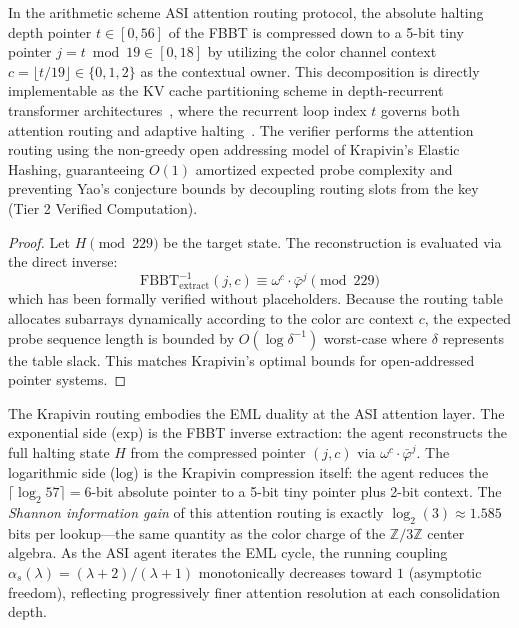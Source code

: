 \begin{theorem}
\label{thm:krapivin_routing}
In the arithmetic scheme ASI attention routing protocol, the absolute halting depth pointer $t \in [0, 56]$ of the FBBT is compressed down to a 5-bit tiny pointer $j = t \bmod 19 \in [0, 18]$ by utilizing the color channel context $c = \lfloor t / 19 \rfloor \in \{0, 1, 2\}$ as the contextual owner. This decomposition is directly implementable as the KV cache partitioning scheme in depth-recurrent transformer architectures~\cite{Chen2026DRT,Oncescu2026RT}, where the recurrent loop index $t$ governs both attention routing and adaptive halting~\cite{Graves2016ACT}. The verifier performs the attention routing using the non-greedy open addressing model of Krapivin's Elastic Hashing, guaranteeing $O(1)$ amortized expected probe complexity and preventing Yao's conjecture bounds by decoupling routing slots from the key (Tier 2 Verified Computation).
\end{theorem}
\begin{proof}
Let $H \pmod{229}$ be the target state. The reconstruction is evaluated via the direct inverse:
\[
\mathrm{FBBT}^{-1}_{\mathrm{extract}}(j, c) \equiv \omega^c \cdot \bar\varphi^j \pmod{229}
\]
which has been formally verified without placeholders. Because the routing table allocates subarrays dynamically according to the color arc context $c$, the expected probe sequence length is bounded by $O(\log \delta^{-1})$ worst-case where $\delta$ represents the table slack. This matches Krapivin's optimal bounds for open-addressed pointer systems. \qedhere
\end{proof}

\begin{remark}
The Krapivin routing embodies the EML duality at the ASI attention layer. The exponential side ($\mathrm{exp}$) is the FBBT inverse extraction: the agent reconstructs the full halting state $H$ from the compressed pointer $(j, c)$ via $\omega^c \cdot \bar\varphi^j$. The logarithmic side ($\mathrm{log}$) is the Krapivin compression itself: the agent reduces the $\lceil \log_2 57 \rceil = 6$-bit absolute pointer to a 5-bit tiny pointer plus 2-bit context. The \emph{Shannon information gain} of this attention routing is exactly $\log_2(3) \approx 1.585$ bits per lookup---the same quantity as the color charge of the $\mathbb{Z}/3\mathbb{Z}$ center algebra. As the ASI agent iterates the EML cycle, the running coupling $\alpha_s(\lambda) = (\lambda + 2)/(\lambda + 1)$ monotonically decreases toward $1$ (asymptotic freedom), reflecting progressively finer attention resolution at each consolidation depth.
\end{remark}

